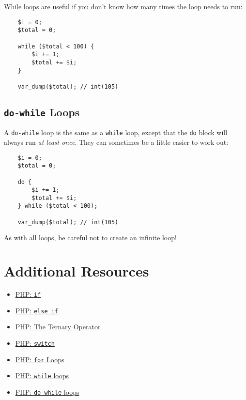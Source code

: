 While loops are useful if you don't know how many times the loop needs to run:

\begin{verbatim}
    $i = 0;
    $total = 0;

    while ($total < 100) {
        $i += 1;
        $total += $i;
    }

    var_dump($total); // int(105)
\end{verbatim}

\subsection{\texttt{do-while} Loops}

A \texttt{do-while} loop is the same as a \texttt{while} loop, except that the \texttt{do} block will always run \textit{at least once}. They can sometimes be a little easier to work out:

\begin{verbatim}
    $i = 0;
    $total = 0;

    do {
        $i += 1;
        $total += $i;
    } while ($total < 100);

    var_dump($total); // int(105)
\end{verbatim}

\hr

As with all loops, be careful not to create an infinite loop!


\section{Additional Resources}

\begin{itemize}[leftmargin=*]
    \item \href{http://www.php.net/manual/en/control-structures.if.php}{PHP: \texttt{if}}
    \item \href{http://www.php.net/manual/en/control-structures.elseif.php}{PHP: \texttt{else if}}
    \item \href{https://www.php.net/manual/en/language.operators.comparison.php#language.operators.comparison.ternary}{PHP: The Ternary Operator}
    \item \href{http://www.php.net/manual/en/control-structures.switch.php}{PHP: \texttt{switch}}
    \item \href{http://www.php.net/manual/en/control-structures.for.php}{PHP: \texttt{for} Loops}
    \item \href{http://www.php.net/manual/en/control-structures.while.php}{PHP: \texttt{while} loops}
    \item \href{http://www.php.net/manual/en/control-structures.do.while.php}{PHP: \texttt{do-while} loops}
\end{itemize}
